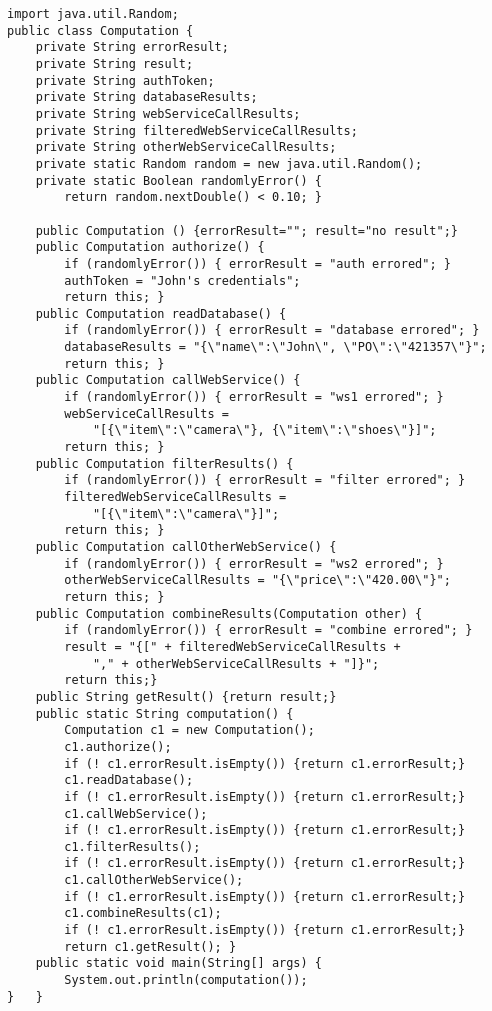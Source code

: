 \documentclass[11pt]{article}
\begin{document}
\begin{verbatim}
import java.util.Random;
public class Computation {
    private String errorResult;
    private String result;
    private String authToken;
    private String databaseResults;
    private String webServiceCallResults;
    private String filteredWebServiceCallResults;
    private String otherWebServiceCallResults;
    private static Random random = new java.util.Random();
    private static Boolean randomlyError() {
        return random.nextDouble() < 0.10; }

    public Computation () {errorResult=""; result="no result";}
    public Computation authorize() {
        if (randomlyError()) { errorResult = "auth errored"; }
        authToken = "John's credentials";
        return this; }
    public Computation readDatabase() {
        if (randomlyError()) { errorResult = "database errored"; }
        databaseResults = "{\"name\":\"John\", \"PO\":\"421357\"}";
        return this; }
    public Computation callWebService() {
        if (randomlyError()) { errorResult = "ws1 errored"; }
        webServiceCallResults =
            "[{\"item\":\"camera\"}, {\"item\":\"shoes\"}]";
        return this; }
    public Computation filterResults() {
        if (randomlyError()) { errorResult = "filter errored"; }
        filteredWebServiceCallResults =
            "[{\"item\":\"camera\"}]";
        return this; }
    public Computation callOtherWebService() {
        if (randomlyError()) { errorResult = "ws2 errored"; }
        otherWebServiceCallResults = "{\"price\":\"420.00\"}";
        return this; }
    public Computation combineResults(Computation other) {
        if (randomlyError()) { errorResult = "combine errored"; }
        result = "{[" + filteredWebServiceCallResults +
            "," + otherWebServiceCallResults + "]}";
        return this;}
    public String getResult() {return result;}
    public static String computation() {
        Computation c1 = new Computation();
        c1.authorize();
        if (! c1.errorResult.isEmpty()) {return c1.errorResult;}
        c1.readDatabase();
        if (! c1.errorResult.isEmpty()) {return c1.errorResult;}
        c1.callWebService();
        if (! c1.errorResult.isEmpty()) {return c1.errorResult;}
        c1.filterResults();
        if (! c1.errorResult.isEmpty()) {return c1.errorResult;}
        c1.callOtherWebService();
        if (! c1.errorResult.isEmpty()) {return c1.errorResult;}
        c1.combineResults(c1);
        if (! c1.errorResult.isEmpty()) {return c1.errorResult;}
        return c1.getResult(); }
    public static void main(String[] args) {
        System.out.println(computation());
}   }
\end{verbatim}
\end{document}
